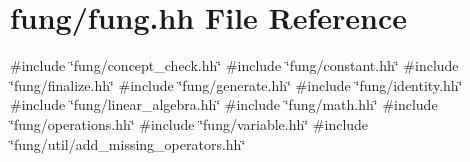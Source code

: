 \hypertarget{fung_8hh}{\section{fung/fung.hh \-File \-Reference}
\label{fung_8hh}
}
{\ttfamily \#include \char`\"{}fung/concept\-\_\-check.\-hh\char`\"{}}\*
{\ttfamily \#include \char`\"{}fung/constant.\-hh\char`\"{}}\*
{\ttfamily \#include \char`\"{}fung/finalize.\-hh\char`\"{}}\*
{\ttfamily \#include \char`\"{}fung/generate.\-hh\char`\"{}}\*
{\ttfamily \#include \char`\"{}fung/identity.\-hh\char`\"{}}\*
{\ttfamily \#include \char`\"{}fung/linear\-\_\-algebra.\-hh\char`\"{}}\*
{\ttfamily \#include \char`\"{}fung/math.\-hh\char`\"{}}\*
{\ttfamily \#include \char`\"{}fung/operations.\-hh\char`\"{}}\*
{\ttfamily \#include \char`\"{}fung/variable.\-hh\char`\"{}}\*
{\ttfamily \#include \char`\"{}fung/util/add\-\_\-missing\-\_\-operators.\-hh\char`\"{}}\*
